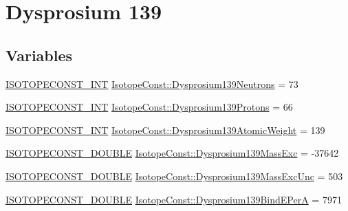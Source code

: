 \hypertarget{group___isotope_const-_dysprosium-_dy139}{}\section{Dysprosium 139}
\label{group___isotope_const-_dysprosium-_dy139}
\subsection*{Variables}
\begin{DoxyCompactItemize}
\item 
\mbox{\hyperlink{group___isotope_const-_macros_ga5f18360b3e99483a35c32d789e62621c}{I\+S\+O\+T\+O\+P\+E\+C\+O\+N\+S\+T\+\_\+\+I\+NT}} \mbox{\hyperlink{group___isotope_const-_dysprosium-_dy139_ga0f202c11b3abc1be556b79245ea09ca0}{Isotope\+Const\+::\+Dysprosium139\+Neutrons}} = 73
\item 
\mbox{\hyperlink{group___isotope_const-_macros_ga5f18360b3e99483a35c32d789e62621c}{I\+S\+O\+T\+O\+P\+E\+C\+O\+N\+S\+T\+\_\+\+I\+NT}} \mbox{\hyperlink{group___isotope_const-_dysprosium-_dy139_ga1c384d63989072cc8b0c2595cd90cc3c}{Isotope\+Const\+::\+Dysprosium139\+Protons}} = 66
\item 
\mbox{\hyperlink{group___isotope_const-_macros_ga5f18360b3e99483a35c32d789e62621c}{I\+S\+O\+T\+O\+P\+E\+C\+O\+N\+S\+T\+\_\+\+I\+NT}} \mbox{\hyperlink{group___isotope_const-_dysprosium-_dy139_ga13f13988a5e451b81dd4e3ea46db246d}{Isotope\+Const\+::\+Dysprosium139\+Atomic\+Weight}} = 139
\item 
\mbox{\hyperlink{group___isotope_const-_macros_ga8f45a7272ce02c0b4c65c44636ed719a}{I\+S\+O\+T\+O\+P\+E\+C\+O\+N\+S\+T\+\_\+\+D\+O\+U\+B\+LE}} \mbox{\hyperlink{group___isotope_const-_dysprosium-_dy139_ga20c8bb65b61d75be4d832a4fd6b4dcc6}{Isotope\+Const\+::\+Dysprosium139\+Mass\+Exc}} = -\/37642
\item 
\mbox{\hyperlink{group___isotope_const-_macros_ga8f45a7272ce02c0b4c65c44636ed719a}{I\+S\+O\+T\+O\+P\+E\+C\+O\+N\+S\+T\+\_\+\+D\+O\+U\+B\+LE}} \mbox{\hyperlink{group___isotope_const-_dysprosium-_dy139_ga0b91c34056ac8bc3ec1da92531d512a7}{Isotope\+Const\+::\+Dysprosium139\+Mass\+Exc\+Unc}} = 503
\item 
\mbox{\hyperlink{group___isotope_const-_macros_ga8f45a7272ce02c0b4c65c44636ed719a}{I\+S\+O\+T\+O\+P\+E\+C\+O\+N\+S\+T\+\_\+\+D\+O\+U\+B\+LE}} \mbox{\hyperlink{group___isotope_const-_dysprosium-_dy139_ga32b94a375d2f2dcf0633ca8b632e0339}{Isotope\+Const\+::\+Dysprosium139\+Bind\+E\+PerA}} = 7971
\item 

\end{DoxyCompactItemize}
